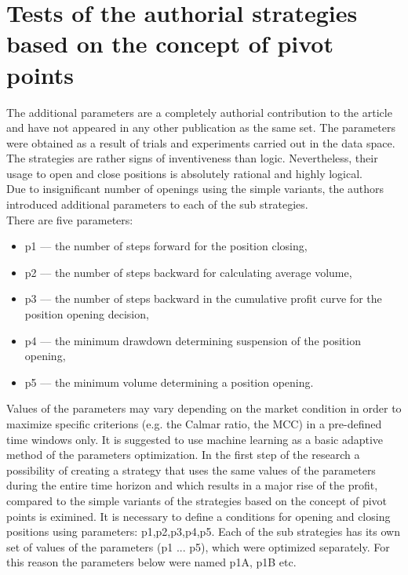 \documentclass{jtacs}
\begin{document}
\section{Tests of the authorial strategies based on the concept of pivot points}
The additional parameters are a completely authorial contribution to the article and have not appeared in any other publication as the same set. The parameters were obtained as a result of trials and experiments carried out in the data space. The strategies are rather signs of inventiveness than logic. Nevertheless, their usage to open and close positions is absolutely rational and highly logical. \\

Due to insignificant number of openings using the simple variants, the authors introduced additional parameters to each of the sub strategies.\\

\noindent There are five parameters:
\begin{itemize}
\item p1 –-- the number of steps forward for the position closing,
\item p2 --– the number of steps backward for calculating average volume, 
\item p3 –-- the number of steps backward in the cumulative profit curve for the position opening decision,
\item p4 --– the minimum drawdown determining  suspension of the position opening,
\item p5 --– the minimum volume determining a position opening.
\end{itemize}


Values of the parameters may vary depending on the market condition in order to maximize specific criterions (e.g. the Calmar ratio, the MCC) in a pre-defined time windows only.  It is suggested to use machine learning as a basic adaptive method of the parameters optimization. In the first step of the research a possibility of creating a strategy that uses the same values of the parameters during the entire time horizon and which results in a major rise of the profit, compared to the simple variants of the strategies based on the concept of pivot points is eximined. It is necessary to define a conditions for opening and closing positions using parameters: p1,p2,p3,p4,p5.
Each of the sub strategies has its own set of values of the parameters (p1 ... p5), which were optimized separately. For this reason the parameters below were named p1A, p1B etc.\\
\end{document}
